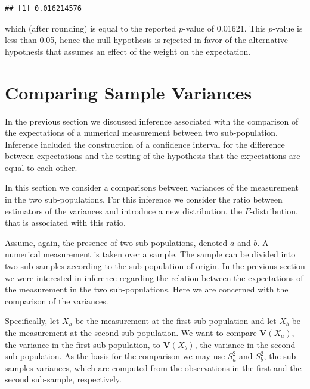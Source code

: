 \documentclass[]{krantz}
\newcommand{\Var}{\mathbf{V}}
\theoremstyle{definition}
\theoremstyle{definition}
\theoremstyle{definition}
\theoremstyle{remark}
\begin{document}
\begin{verbatim}
## [1] 0.016214576
\end{verbatim}

which (after rounding) is equal to the reported \(p\)-value of 0.01621.
This \(p\)-value is less than 0.05, hence the null hypothesis is rejected
in favor of the alternative hypothesis that assumes an effect of the
weight on the expectation.

\hypertarget{comparing-sample-variances}{%
\section{Comparing Sample Variances}\label{comparing-sample-variances}}

In the previous section we discussed inference associated with the
comparison of the expectations of a numerical measurement between two
sub-population. Inference included the construction of a confidence
interval for the difference between expectations and the testing of the
hypothesis that the expectations are equal to each other.

In this section we consider a comparisons between variances of the
measurement in the two sub-populations. For this inference we consider
the ratio between estimators of the variances and introduce a new
distribution, the \(F\)-distribution, that is associated with this ratio.

Assume, again, the presence of two sub-populations, denoted \(a\) and \(b\).
A numerical measurement is taken over a sample. The sample can be
divided into two sub-samples according to the sub-population of origin.
In the previous section we were interested in inference regarding the
relation between the expectations of the measurement in the two
sub-populations. Here we are concerned with the comparison of the
variances.

Specifically, let \(X_a\) be the measurement at the first sub-population
and let \(X_b\) be the measurement at the second sub-population. We want
to compare \(\Var(X_a)\), the variance in the first sub-population, to
\(\Var(X_b)\), the variance in the second sub-population. As the basis for
the comparison we may use \(S_a^2\) and \(S_b^2\), the sub-samples
variances, which are computed from the observations in the first and the
second sub-sample, respectively.
\end{document}
